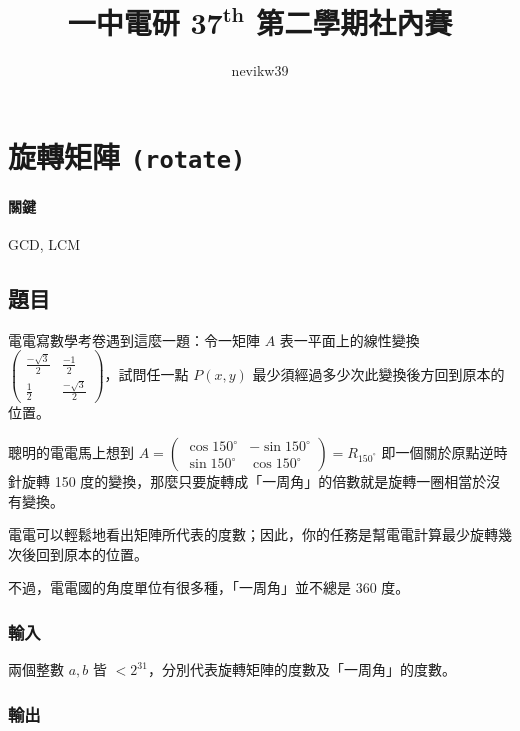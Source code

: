 \documentclass[a4paper,10pt]{article}
\title{\fontseries{b}一中電研 $\mathbf{37^{th}}$ 第二學期社內賽 \enspace {\huge\fontseries{eb}\selectfont 題目解析}}
\author{\fontshape{it}nevikw39}
\begin{document}
\maketitle

\begin{abstract}


\end{abstract}

\section{旋轉矩陣 \texttt{(rotate)}}

\paragraph{關鍵} GCD, LCM

\subsection{題目}

電電寫數學考卷遇到這麼一題：令一矩陣 $A$ 表一平面上的線性變換 $\begin{pmatrix} \frac{-\sqrt{3}}{2} & \frac{-1}{2}\\ \frac{1}{2} & \frac{-\sqrt{3}}{2} \end{pmatrix}$，試問任一點 $P(x, y)$ 最少須經過多少次此變換後方回到原本的位置。

聰明的電電馬上想到 $A = \begin{pmatrix} \cos 150^{\circ} & -\sin 150^{\circ}\\ \sin 150^{\circ} & \cos 150^{\circ} \end{pmatrix} = R_{150^{\circ}}$ 即一個關於原點逆時針旋轉 150 度的變換，那麼只要旋轉成「一周角」的倍數就是旋轉一圈相當於沒有變換。

電電可以輕鬆地看出矩陣所代表的度數；因此，你的任務是幫電電計算最少旋轉幾次後回到原本的位置。

不過，電電國的角度單位有很多種，「一周角」並不總是 360 度。

\subsubsection{輸入}

兩個整數 $a, b$ 皆 $< 2^{31}$，分別代表旋轉矩陣的度數及「一周角」的度數。

\subsubsection{輸出}
\end{document}
